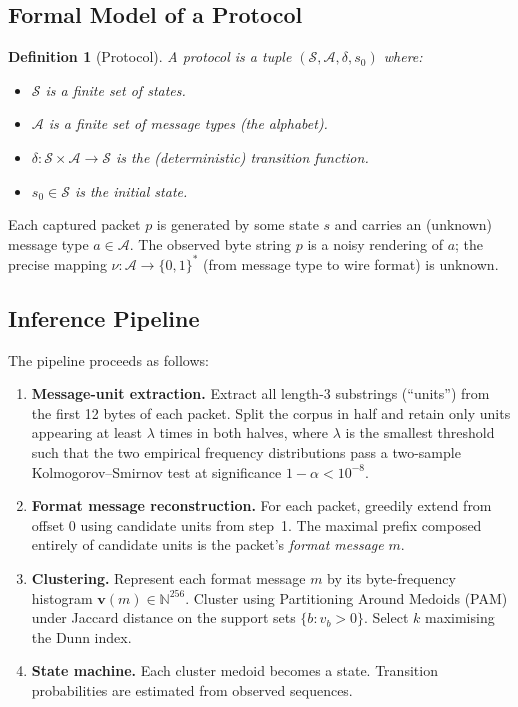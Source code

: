 \documentclass[11pt,a4paper]{article}
\newtheorem{definition}{Definition}
\begin{document}
\subsection{Formal Model of a Protocol}

\begin{definition}[Protocol]
A protocol is a tuple $(\mathcal{S}, \mathcal{A}, \delta, s_0)$ where:
\begin{itemize}
  \item $\mathcal{S}$ is a finite set of states.
  \item $\mathcal{A}$ is a finite set of message types (the alphabet).
  \item $\delta: \mathcal{S} \times \mathcal{A} \to \mathcal{S}$ is the
        (deterministic) transition function.
  \item $s_0 \in \mathcal{S}$ is the initial state.
\end{itemize}
\end{definition}

Each captured packet $p$ is generated by some state $s$ and carries an
(unknown) message type $a \in \mathcal{A}$.  The observed byte string
$p$ is a noisy rendering of $a$; the precise mapping
$\nu: \mathcal{A} \to \{0,1\}^*$ (from message type to wire format) is
unknown.

\subsection{Inference Pipeline}

The pipeline proceeds as follows:

\begin{enumerate}
  \item \textbf{Message-unit extraction.}
        Extract all length-3 substrings (``units'') from the first 12
        bytes of each packet.  Split the corpus in half and retain only
        units appearing at least $\lambda$ times in both halves, where
        $\lambda$ is the smallest threshold such that the two empirical
        frequency distributions pass a two-sample Kolmogorov--Smirnov
        test at significance $1 - \alpha < 10^{-8}$.
  \item \textbf{Format message reconstruction.}
        For each packet, greedily extend from offset 0 using candidate
        units from step~1.  The maximal prefix composed entirely of
        candidate units is the packet's \emph{format message} $m$.
  \item \textbf{Clustering.}
        Represent each format message $m$ by its byte-frequency histogram
        $\mathbf{v}(m) \in \mathbb{N}^{256}$.  Cluster using
        Partitioning Around Medoids (PAM) under Jaccard distance on the
        support sets $\{b : v_b > 0\}$.  Select $k$ maximising the
        Dunn index.
  \item \textbf{State machine.}
        Each cluster medoid becomes a state.  Transition probabilities
        are estimated from observed sequences.
\end{enumerate}
\end{document}
